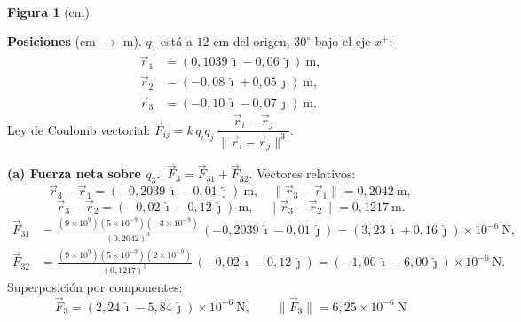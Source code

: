 \documentclass[12pt,letterpaper]{article}
\newcommand{\secgap}{\vspace{0.55cm}}
\begin{document}
\medskip
\noindent
\begin{minipage}[c]{0.40\textwidth}
\centering
{}\\[1pt]
{\scriptsize \textbf{Figura 1} (cm)}
\end{minipage}%
\hfill
\begin{minipage}[c]{0.56\textwidth}
\textbf{Posiciones} (cm $\to$ m). $q_1$ est\'a a $12$ cm del origen, $30^\circ$ bajo el eje $x^+$:
\begin{align*}
\vec r_1&=(0{,}1039\,\hat\imath-0{,}06\,\hat\jmath)\ \mathrm{m},\\
\vec r_2&=(-0{,}08\,\hat\imath+0{,}05\,\hat\jmath)\ \mathrm{m},\\
\vec r_3&=(-0{,}10\,\hat\imath-0{,}07\,\hat\jmath)\ \mathrm{m}.
\end{align*}
Ley de Coulomb vectorial:
$\vec F_{ij}=k\,q_i q_j\,\dfrac{\vec r_i-\vec r_j}{\lVert\vec r_i-\vec r_j\rVert^{3}}$.
\end{minipage}

\secgap

\noindent\textbf{(a) Fuerza neta sobre $q_3$.} $\ \vec F_3=\vec F_{31}+\vec F_{32}$. Vectores relativos:
\[
\vec r_3-\vec r_1=(-0{,}2039\,\hat\imath-0{,}01\,\hat\jmath)\ \mathrm{m},\quad \lVert\vec r_3-\vec r_1\rVert=0{,}2042\ \mathrm{m},
\]
\[
\vec r_3-\vec r_2=(-0{,}02\,\hat\imath-0{,}12\,\hat\jmath)\ \mathrm{m},\quad \lVert\vec r_3-\vec r_2\rVert=0{,}1217\ \mathrm{m}.
\]
\begin{align*}
\vec F_{31}&=\frac{(9\times10^{9})(5\times10^{-9})(-3\times10^{-9})}{(0{,}2042)^{3}}\,(-0{,}2039\,\hat\imath-0{,}01\,\hat\jmath)
=(3{,}23\,\hat\imath+0{,}16\,\hat\jmath)\times10^{-6}\ \mathrm{N},\\[2pt]
\vec F_{32}&=\frac{(9\times10^{9})(5\times10^{-9})(2\times10^{-9})}{(0{,}1217)^{3}}\,(-0{,}02\,\hat\imath-0{,}12\,\hat\jmath)
=(-1{,}00\,\hat\imath-6{,}00\,\hat\jmath)\times10^{-6}\ \mathrm{N}.
\end{align*}
Superposici\'on por componentes:
\[
\boxed{\ \vec F_3=(2{,}24\,\hat\imath-5{,}84\,\hat\jmath)\times10^{-6}\ \mathrm{N},\qquad
\lVert\vec F_3\rVert=6{,}25\times10^{-6}\ \mathrm{N}\ }
\]
\end{document}
